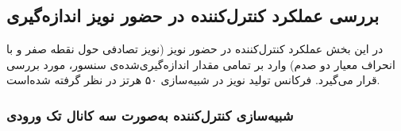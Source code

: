 
\subsection{بررسی عملكرد کنترل‌کننده در حضور نويز اندازه‌گیری}\label{3dof_noise}
در این بخش عملکرد کنترل‌کننده در حضور نویز (نویز تصادفی حول نقطه صفر و با انحراف معیار دو صدم) وارد بر تمامی مقدار  اندازه‌گیری‌شده‌ی سنسور، مورد بررسی قرار می‌گیرد. فرکانس تولید نویز در شبیه‌سازی ۵۰ هرتز در نظر گرفته شده‌است.
\subsubsection{شبیه‌سازی کنترل‌کننده به‌صورت سه کانال تک ورودی}
%
